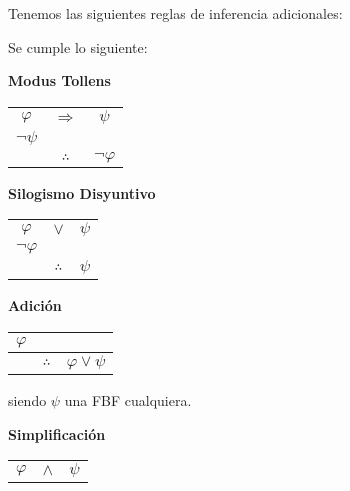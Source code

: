 \documentclass[12pt]{report}
\theoremstyle{largebreak}
\begin{document}
    Tenemos las siguientes reglas de inferencia adicionales:

    \begin{propo}
        Se cumple lo siguiente:
        \begin{center}
            \textbf{Modus Tollens}
        \end{center}
        \begin{center}
            \begin{tabular}{c c c}
                $\varphi$ & $\Rightarrow$ & $\psi$ \\
                $\neg\psi$ &  &  \\
                \hline
                 & $\therefore$ & $\neg\varphi$ \\
            \end{tabular}
        \end{center}
        \begin{center}
            \textbf{Silogismo Disyuntivo}
        \end{center}
        \begin{center}
            \begin{tabular}{c c c}
                $\varphi$ & $\lor$ & $\psi$ \\
                $\neg\varphi$ &  &  \\
                \hline
                 & $\therefore$ & $\psi$ \\
            \end{tabular}
        \end{center}
        \begin{center}
            \textbf{Adición}
        \end{center}
        \begin{center}
            \begin{tabular}{c c c}
                $\varphi$ &  &  \\
                \hline
                 & $\therefore$ & $\varphi\lor\psi$ \\
            \end{tabular}
        \end{center}
        siendo $\psi$ una FBF cualquiera.
        \begin{center}
            \textbf{Simplificación}
        \end{center}
        \begin{center}
            \begin{tabular}{c c c}
                $\varphi$ & $\land$ & $\psi$ \\

\end{tabular}
\end{center}
\end{propo}
\end{document}
